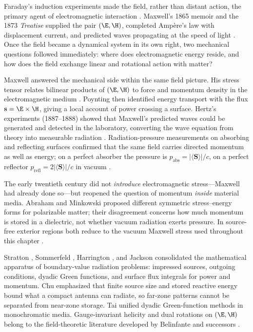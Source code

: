 Faraday's induction experiments made the field, rather than distant action, the primary agent of electromagnetic interaction \cite{maxwell1873}. Maxwell's 1865 memoir and the 1873 \emph{Treatise} supplied the pair $(\E,\H)$, completed Amp\`ere's law with displacement current, and predicted waves propagating at the speed of light \cite{maxwell1873}. Once the field became a dynamical system in its own right, two mechanical questions followed immediately: where does electromagnetic energy reside, and how does the field exchange linear and rotational action with matter?

Maxwell answered the mechanical side within the same field picture. His stress tensor
relates bilinear products of $(\E,\H)$ to force and momentum density in the
electromagnetic medium \cite{maxwell1873,stratton1941}. Poynting \cite{poynting1884}
then identified energy transport with the flux $\mathbf{s}=\E\times\H$, giving a local
account of power crossing a surface. Hertz's experiments (1887--1888) showed that
Maxwell's predicted waves could be generated and detected in the laboratory, converting
the wave equation from theory into measurable radiation \cite{stratton1941}. Radiation-pressure
measurements on absorbing and reflecting surfaces confirmed that the same field carries
directed momentum as well as energy; on a perfect absorber the pressure is $p_{\mathrm{abs}}=|\langle\mathbf{S}\rangle|/c$, on a
perfect reflector $p_{\mathrm{refl}}=2|\langle\mathbf{S}\rangle|/c$ in vacuum \cite{stratton1941}.

The early twentieth century did not \emph{introduce} electromagnetic stress---Maxwell
had already done so---but reopened the question of momentum \emph{inside} material
media. Abraham \cite{abraham1910} and Minkowski \cite{minkowski1908} proposed different
symmetric stress--energy forms for polarizable matter; their disagreement concerns how
much momentum is stored in a dielectric, not whether vacuum radiation exerts pressure.
In source-free exterior regions both reduce to the vacuum Maxwell stress used throughout
this chapter \cite{stratton1941}.

Stratton \cite{stratton1941}, Sommerfeld \cite{sommerfeld1949}, Harrington
\cite{harrington2001}, and Jackson \cite{jackson1999} consolidated the mathematical
apparatus of boundary-value radiation problems: impressed sources, outgoing conditions,
dyadic Green functions, and surface flux integrals for power and momentum. Chu
\cite{chu1948} emphasized that finite source size and stored reactive energy bound what
a compact antenna can radiate, so far-zone patterns cannot be separated from near-zone
storage. Tai \cite{tai1994} unified dyadic Green-function methods in monochromatic media. Gauge-invariant helicity and dual rotations on $(\E,\H)$ belong to the field-theoretic literature developed by Belinfante and successors \cite{belinfante1940,tai1994}.

